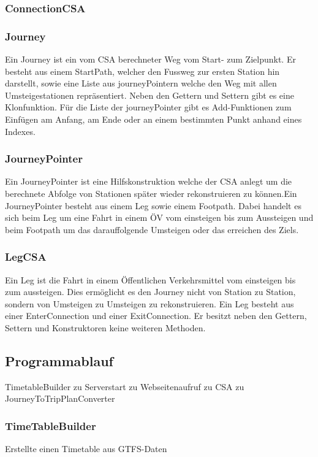 \subsubsection{ConnectionCSA}

\subsubsection{Journey}
Ein Journey ist ein vom CSA berechneter Weg vom Start- zum Zielpunkt. Er besteht aus einem StartPath, welcher den Fussweg zur ersten Station hin darstellt, sowie eine Liste aus journeyPointern welche den Weg mit allen Umsteigestationen repräsentiert. Neben den Gettern und Settern gibt es eine Klonfunktion. Für die Liste der journeyPointer gibt es Add-Funktionen zum Einfügen am Anfang, am Ende oder an einem bestimmten Punkt anhand eines Indexes.

\subsubsection{JourneyPointer}
Ein JourneyPointer ist eine Hilfskonstruktion welche der CSA anlegt um die berechnete Abfolge von Stationen später wieder rekonstruieren zu können.Ein JourneyPointer besteht aus einem Leg sowie einem Footpath. Dabei handelt es sich beim Leg um eine Fahrt in einem ÖV vom einsteigen bis zum Aussteigen und beim Footpath um das darauffolgende Umsteigen oder das erreichen des Ziels.

\subsubsection{LegCSA}
Ein Leg ist die Fahrt in einem Öffentlichen Verkehrsmittel vom einsteigen bis zum aussteigen. Dies ermöglicht es den Journey nicht von Station zu Station, sondern von Umsteigen zu Umsteigen zu rekonstruieren. Ein Leg besteht aus einer EnterConnection und einer ExitConnection. Er besitzt neben den Gettern, Settern und Konstruktoren keine weiteren Methoden.

\subsection{Programmablauf}
TimetableBuilder zu Serverstart zu Webseitenaufruf zu CSA zu JourneyToTripPlanConverter

\subsubsection{TimeTableBuilder}
Erstellte einen Timetable aus GTFS-Daten

